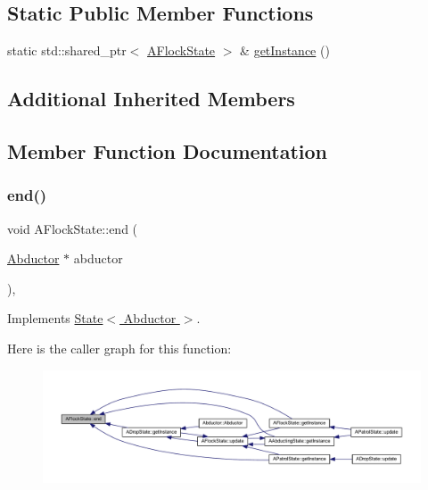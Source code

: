 \subsection*{Static Public Member Functions}
\begin{DoxyCompactItemize}
\item 
static std\+::shared\+\_\+ptr$<$ \hyperlink{class_a_flock_state}{A\+Flock\+State} $>$ \& \hyperlink{class_a_flock_state_a838c2fa41a3ff8c863f4bcfe80637c4d}{get\+Instance} ()
\end{DoxyCompactItemize}
\subsection*{Additional Inherited Members}


\subsection{Member Function Documentation}
\mbox{\label{class_a_flock_state_af81fa7c9e9eb5185e8cd950aceb758f3}} 
\subsubsection{\texorpdfstring{end()}{end()}}
{\footnotesize\ttfamily void A\+Flock\+State\+::end (\begin{DoxyParamCaption}\item[{\hyperlink{class_abductor}{Abductor} $\ast$}]{abductor }\end{DoxyParamCaption})\hspace{0.3cm}{\ttfamily [override]}, {\ttfamily [virtual]}}



Implements \hyperlink{class_state_a97d058722f988c008e912a0e5ec879b3}{State$<$ Abductor $>$}.

Here is the caller graph for this function\+:
\nopagebreak
\begin{figure}[H]
\begin{center}
\leavevmode
\includegraphics[width=350pt]{class_a_flock_state_af81fa7c9e9eb5185e8cd950aceb758f3_icgraph}
\end{center}
\end{figure}
\mbox{\label{class_a_flock_state_a838c2fa41a3ff8c863f4bcfe80637c4d}} 
